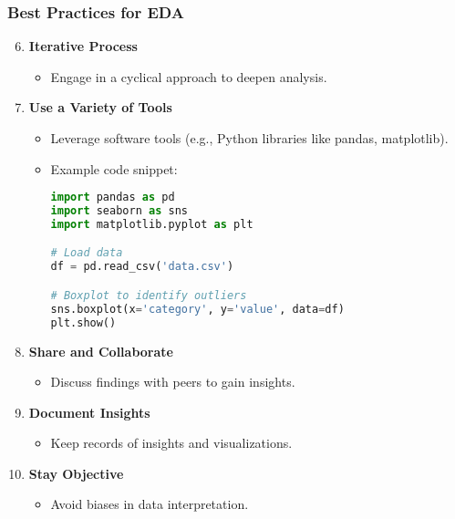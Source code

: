 \documentclass{beamer}
\begin{document}
\begin{frame}[fragile]
    \frametitle{Best Practices for EDA}

    \begin{enumerate}
        \setcounter{enumi}{5} %
        \item \textbf{Iterative Process}
            \begin{itemize}
                \item Engage in a cyclical approach to deepen analysis.
            \end{itemize}
        
        \item \textbf{Use a Variety of Tools}
            \begin{itemize}
                \item Leverage software tools (e.g., Python libraries like pandas, matplotlib).
                \item Example code snippet:
                \begin{lstlisting}[language=Python]
import pandas as pd
import seaborn as sns
import matplotlib.pyplot as plt

# Load data
df = pd.read_csv('data.csv')

# Boxplot to identify outliers
sns.boxplot(x='category', y='value', data=df)
plt.show()
                \end{lstlisting}
            \end{itemize}
        
        \item \textbf{Share and Collaborate}
            \begin{itemize}
                \item Discuss findings with peers to gain insights.
            \end{itemize}

        \item \textbf{Document Insights}
            \begin{itemize}
                \item Keep records of insights and visualizations.
            \end{itemize}

        \item \textbf{Stay Objective}
            \begin{itemize}
                \item Avoid biases in data interpretation.
            \end{itemize}
    \end{enumerate}
\end{frame}
\end{document}
